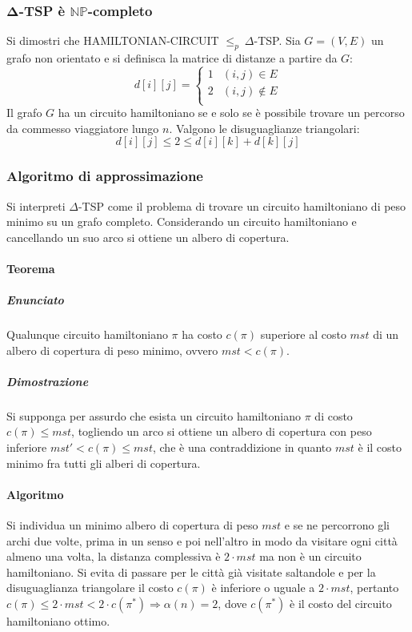 \subsubsection{$\mathbf{\Delta}$-TSP \`e $\mathbf{\mathbb{NP}}$-completo}
Si dimostri che HAMILTONIAN-CIRCUIT $\le_p\ \Delta$-TSP. Sia $G=(V, E)$ un grafo non orientato e si definisca la matrice di distanze a partire da $G$:
$$d[i][j] = 
\begin{cases}
	1 & (i, j)\in E\\
	2 & (i, j)\not\in E\\
\end{cases}$$
Il grafo $G$ ha un circuito hamiltoniano se e solo se \`e possibile trovare un percorso da commesso viaggiatore lungo $n$. Valgono le disuguaglianze triangolari:
$$d[i][j] \le 2\le d[i][k] + d[k][j]$$
\subsubsection{Algoritmo di approssimazione}
Si interpreti $\Delta$-TSP come il problema di trovare un circuito hamiltoniano di peso minimo su un grafo completo. Considerando un circuito hamiltoniano e cancellando un
suo arco si ottiene un albero di copertura. 
\paragraph{Teorema}
\subparagraph{Enunciato}
Qualunque circuito hamiltoniano $\pi$ ha costo $c(\pi)$ superiore al costo $mst$ di un albero di copertura di peso minimo, ovvero $mst < c(\pi)$.
\subparagraph{Dimostrazione}
Si supponga per assurdo che esista un circuito hamiltoniano $\pi$ di costo $c(\pi)\le mst$, togliendo un arco si ottiene un albero di copertura con peso inferiore $mst' < c(\pi)\le mst$,
che \`e una contraddizione in quanto $mst$ \`e il costo minimo fra tutti gli alberi di copertura. 
\paragraph{Algoritmo}
Si individua un minimo albero di copertura di peso $mst$ e se ne percorrono gli archi due volte, prima in un senso e poi nell'altro in modo da visitare ogni citt\`a almeno una volta, 
la distanza complessiva \`e $2\cdot mst$ ma non \`e un circuito hamiltoniano. Si evita di passare per le citt\`a gi\`a visitate saltandole e per la disuguaglianza triangolare il
costo $c(\pi)$ \`e inferiore o uguale a $2\cdot mst$, pertanto $c(\pi)\le 2\cdot mst< 2\cdot c(\pi^*)\Rightarrow \alpha(n) = 2$, dove $c(\pi^*)$ \`e il costo del circuito hamiltoniano
ottimo. 
